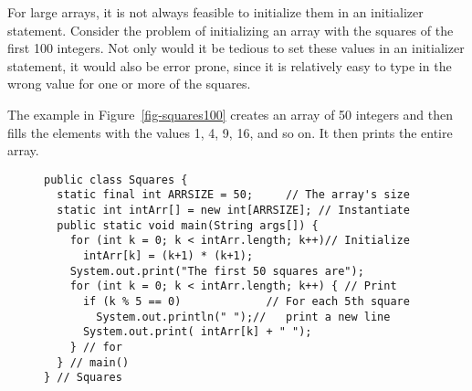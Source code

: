 For large arrays, it is not always feasible to initialize them in an
initializer statement.  Consider the problem of initializing an array
with the squares of the first 100 integers.  Not only would it be
tedious to set these values in an initializer statement, it would also
be error prone, since it is relatively easy to type in the wrong value
for one or more of the squares.


\noindent The example in Figure~\ref{fig-squares100} creates an array of 50
integers and then fills the elements with the values 1, 4, 9, 16, and
so on.  It then prints the entire array.

\begin{figure}[h!]
\jjjprogstart
\begin{jjjlisting}
\begin{lstlisting}
public class Squares {
  static final int ARRSIZE = 50;     // The array's size
  static int intArr[] = new int[ARRSIZE]; // Instantiate
  public static void main(String args[]) {
    for (int k = 0; k < intArr.length; k++)// Initialize
      intArr[k] = (k+1) * (k+1);
    System.out.print("The first 50 squares are"); 
    for (int k = 0; k < intArr.length; k++) { // Print
      if (k % 5 == 0)             // For each 5th square
        System.out.println(" ");//   print a new line
      System.out.print( intArr[k] + " ");
    } // for
  } // main()
} // Squares
\end{lstlisting}
\end{jjjlisting}
\end{figure}


